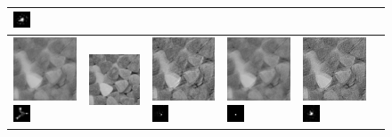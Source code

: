 \begin{figure}
\begin{tabular}{|l|l|l|l|l|l|}
\includegraphics[width=0.5cm]{results/candy_kernel1_MAPkreg_k.png}
\\ 
 \hline\includegraphics[width=2.5cm]{results/candy_kernel2_blurred.png}
\includegraphics[width=0.5cm]{images/kernel2}
& \includegraphics[width=2.5cm]{results/candy_kernel2_nonblind_deconv.png}
&\includegraphics[width=2.5cm]{results/candy_kernel2_MAPxk_x.png}
\includegraphics[width=0.5cm]{results/candy_kernel2_MAPxk_k.png}
&\includegraphics[width=2.5cm]{results/candy_kernel2_MAPk_x.png}
\includegraphics[width=0.5cm]{results/candy_kernel2_MAPk_k.png}
&\includegraphics[width=2.5cm]{results/candy_kernel2_MAPkreg_x.png}
\includegraphics[width=0.5cm]{results/candy_kernel2_MAPkreg_k.png}

\end{tabular}
\end{figure}
